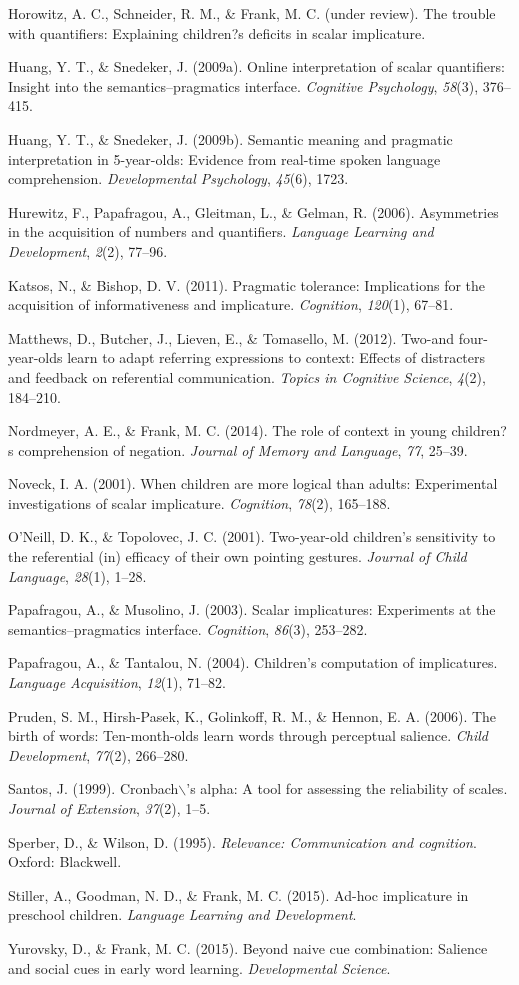 \documentclass[a4paper,man,apacite,floatsintext]{apa6}
\begin{document}
Horowitz, A. C., Schneider, R. M., \& Frank, M. C. (under review). The
trouble with quantifiers: Explaining children?s deficits in scalar
implicature.

Huang, Y. T., \& Snedeker, J. (2009a). Online interpretation of scalar
quantifiers: Insight into the semantics--pragmatics interface.
\emph{Cognitive Psychology}, \emph{58}(3), 376--415.

Huang, Y. T., \& Snedeker, J. (2009b). Semantic meaning and pragmatic
interpretation in 5-year-olds: Evidence from real-time spoken language
comprehension. \emph{Developmental Psychology}, \emph{45}(6), 1723.

Hurewitz, F., Papafragou, A., Gleitman, L., \& Gelman, R. (2006).
Asymmetries in the acquisition of numbers and quantifiers.
\emph{Language Learning and Development}, \emph{2}(2), 77--96.

Katsos, N., \& Bishop, D. V. (2011). Pragmatic tolerance: Implications
for the acquisition of informativeness and implicature.
\emph{Cognition}, \emph{120}(1), 67--81.

Matthews, D., Butcher, J., Lieven, E., \& Tomasello, M. (2012). Two-and
four-year-olds learn to adapt referring expressions to context: Effects
of distracters and feedback on referential communication. \emph{Topics
in Cognitive Science}, \emph{4}(2), 184--210.

Nordmeyer, A. E., \& Frank, M. C. (2014). The role of context in young
children?s comprehension of negation. \emph{Journal of Memory and
Language}, \emph{77}, 25--39.

Noveck, I. A. (2001). When children are more logical than adults:
Experimental investigations of scalar implicature. \emph{Cognition},
\emph{78}(2), 165--188.

O'Neill, D. K., \& Topolovec, J. C. (2001). Two-year-old children's
sensitivity to the referential (in) efficacy of their own pointing
gestures. \emph{Journal of Child Language}, \emph{28}(1), 1--28.

Papafragou, A., \& Musolino, J. (2003). Scalar implicatures: Experiments
at the semantics--pragmatics interface. \emph{Cognition}, \emph{86}(3),
253--282.

Papafragou, A., \& Tantalou, N. (2004). Children's computation of
implicatures. \emph{Language Acquisition}, \emph{12}(1), 71--82.

Pruden, S. M., Hirsh-Pasek, K., Golinkoff, R. M., \& Hennon, E. A.
(2006). The birth of words: Ten-month-olds learn words through
perceptual salience. \emph{Child Development}, \emph{77}(2), 266--280.

Santos, J. (1999). Cronbach\(\backslash\)'s alpha: A tool for assessing
the reliability of scales. \emph{Journal of Extension}, \emph{37}(2),
1--5.

Sperber, D., \& Wilson, D. (1995). \emph{Relevance: Communication and
cognition}. Oxford: Blackwell.

Stiller, A., Goodman, N. D., \& Frank, M. C. (2015). Ad-hoc implicature
in preschool children. \emph{Language Learning and Development}.

Yurovsky, D., \& Frank, M. C. (2015). Beyond naive cue combination:
Salience and social cues in early word learning. \emph{Developmental
Science}.


\end{document}
